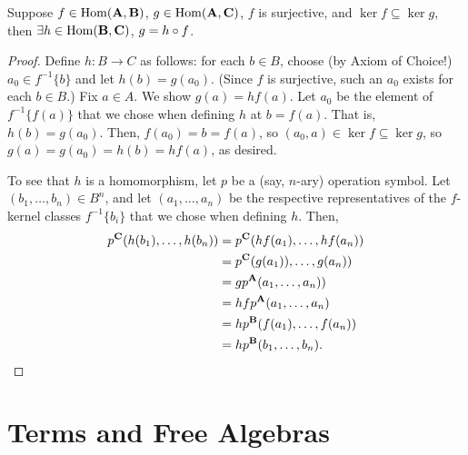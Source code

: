 \begin{lemma}
  \label{ex:1.26.8}
  Suppose $f \in \operatorname{Hom}(\mathbf{A},\mathbf{B})$, $g \in \operatorname{Hom}(\mathbf{A},\mathbf{C})$, 
  $f$ is surjective, and $\ker f \subseteq \ker g$, then $\exists h \in \operatorname{Hom}(\mathbf{B},\mathbf{C})$, $g = h \circ f$.
\end{lemma}
\begin{proof}
Define $h\colon B \to C$ as follows: for each $b\in B$, choose (by Axiom of Choice!) $a_0\in f^{-1}\{b\}$
and let $h(b) = g(a_0)$.  (Since $f$ is surjective, such an $a_0$ exists for each $b\in B$.)
Fix $a \in A$.  We show $g(a) = h f(a)$. Let $a_0$ be the element of $f^{-1}\{f(a)\}$ that we
chose when defining $h$ at $b = f(a)$. That is, $h(b) = g(a_0)$.
Then, $f(a_0) = b = f(a)$, so $(a_0, a) \in \ker f\subseteq \ker g$, so 
$g(a) = g(a_0) = h(b) = h f(a)$, as desired.

To see that $h$ is a homomorphism, let $p$ be a (say, $n$-ary) operation symbol.
Let $(b_1, \dots, b_n) \in B^n$, and let $(a_1, \dots, a_n)$ be the respective representatives
of the $f$-kernel classes $f^{-1}\{b_i\}$ that we chose when defining $h$.
Then,
\begin{align*}
p^{\mathbf{C}}(h(b_1), \dots, h(b_n)) &=  p^{\mathbf{C}}(h f(a_1), \dots, h f(a_n))\\
&=  p^{\mathbf{C}}(g(a_1)), \dots, g(a_n))\\
&=  g p^{\mathbf{A}}(a_1, \dots, a_n))\\
&=  h f p^{\mathbf{A}}(a_1, \dots, a_n)\\
&=  h p^{\mathbf{B}}(f(a_1), \dots, f(a_n))\\
&=  h p^{\mathbf{B}}(b_1, \dots, b_n).
\end{align*}
\end{proof}

\section{Terms and Free Algebras}



